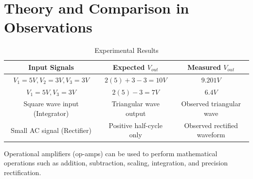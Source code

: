 \documentclass[a4paper,12pt]{article}
\begin{document}
\section{Theory and Comparison in Observations}
\begin{table}[H]
    \centering
    \begin{tabular}{|c|c|c|}
        \hline
        \textbf{Input Signals} & \textbf{Expected \( V_{out} \)} & \textbf{Measured \( V_{out} \)} \\
        \hline
        \( V_1 = 5V, V_2 = 3V, V_3 = 3V \) & \( 2(5) + 3 - 3 = 10V \) & \( 9.201V \) \\
        \hline
        \( V_1 = 5V, V_3 = 3V \) & \( 2(5) - 3 = 7V \) & \( 6.4V \) \\
        \hline
        Square wave input (Integrator) & Triangular wave output & Observed triangular wave \\
        \hline
        Small AC signal (Rectifier) & Positive half-cycle only & Observed rectified waveform \\
        \hline
    \end{tabular}
    \caption{Experimental Results}
    \label{tab:results}
\end{table}

Operational amplifiers (op-amps) can be used to perform mathematical operations such as addition, subtraction, scaling, integration, and precision rectification.
\end{document}
